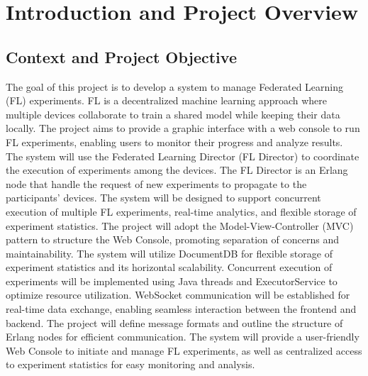 \chapter{Introduction and Project Overview}

\section{Context and Project Objective}

The goal of this project is to develop a system to manage Federated Learning (FL) experiments. 
FL is a decentralized machine learning approach where multiple devices collaborate to train a 
shared model while keeping their data locally. The project aims to provide a graphic interface
 with a web console to run FL experiments, enabling users to monitor their progress and analyze 
 results. The system will use the Federated Learning Director (FL Director) to coordinate the 
 execution of experiments among the devices. The FL Director is an Erlang node that handle the 
 request of new experiments to propagate to the participants' devices. The system will be designed to support
  concurrent execution of multiple FL experiments, real-time analytics, and flexible storage
   of experiment statistics. The project will adopt the Model-View-Controller (MVC) pattern 
   to structure the Web Console, promoting separation of concerns and maintainability. The 
   system will utilize DocumentDB for flexible storage of experiment statistics and its
    horizontal scalability. Concurrent execution of experiments will be implemented using Java 
    threads and ExecutorService to optimize resource utilization. WebSocket communication 
    will be established for real-time data exchange, enabling seamless interaction between
     the frontend and backend. The project will define message formats and outline the structure
      of Erlang nodes for efficient communication. The system will provide a user-friendly
       Web Console to initiate and manage FL experiments, as well as centralized access to 
       experiment statistics for easy monitoring and analysis.

